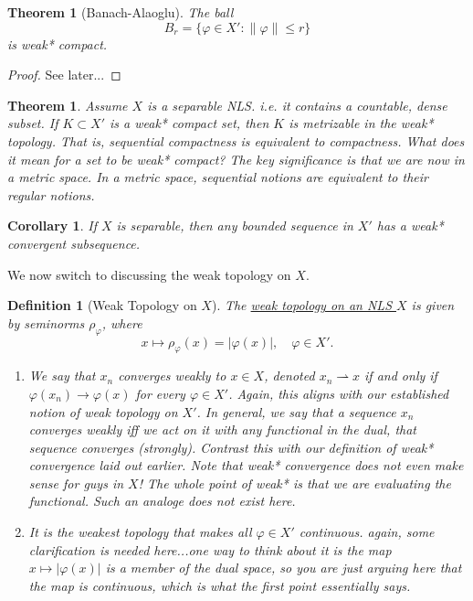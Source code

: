 \documentclass[letterpaper,twoside,11pt]{article}
\theoremstyle{mystyle}
\newtheorem{theorem}{Theorem}[section]
\newtheorem*{thm}{Theorem}		%
\newtheorem{definition}{Definition}[section]
\newtheorem{corollary}{Corollary}[theorem]
\newcommand{\cg}{\color{gray}}
\newcommand{\cbk}{\color{black}}
\newcommand{\cred}{\color{red}}
\begin{document}
\begin{tcolorbox}[colback=red!5!white,colframe=red!75!black]
  \begin{thm}[Banach-Alaoglu]
    The ball \[B_r = \{\varphi \in X' : \|\varphi\|\leq r\}\] is weak* compact. 
  \end{thm}
\end{tcolorbox}
\begin{proof}
  \cred See later...\cbk
\end{proof}
\begin{tcolorbox}[colback=red!5!white,colframe=red!75!black]
\begin{theorem}
  Assume $X$ is a separable NLS. \cg i.e. it contains a countable, dense subset. \cbk If $K\subset X'$ is a weak* compact set, then $K$ is metrizable in the weak* topology. That is, sequential compactness is equivalent to compactness. \cg What does it mean for a set to be weak* compact? The key significance is that we are now in a metric space. In a metric space, sequential notions are equivalent to their regular notions. \cbk
\end{theorem}
\end{tcolorbox}
\begin{tcolorbox}[colback=gray!5!white,colframe=red!75!black]
\begin{corollary}
  If $X$ is separable, then any bounded sequence in $X'$ has a weak* convergent subsequence. 
\end{corollary}
\end{tcolorbox}

We now switch to discussing the weak topology on $X$. 

\begin{definition}[Weak Topology on $X$]
  The \underline{weak topology on an NLS $X$} is given by seminorms $\rho_\varphi$, where 
  \[x\longmapsto \rho_\varphi(x)=|\varphi(x)|,\quad \varphi \in X'.\] 
  \begin{enumerate}
    \item We say that $x_n$ converges weakly to $x\in X$, denoted $x_n \rightharpoonup x$ if and only if $\varphi(x_n)\to \varphi(x)$ for every $\varphi \in X'$. \cg Again, this aligns with our established notion of weak topology on $X'$. In general, we say that a sequence $x_n$ converges weakly iff we act on it with any functional in the dual, that sequence converges (strongly). Contrast this with our definition of weak* convergence laid out earlier. Note that weak* convergence does not even make sense for guys in $X$! The whole point of weak* is that we are evaluating the functional. Such an analoge does not exist here. \cbk
    \item It is the weakest topology that makes all $\varphi \in X'$ continuous. \cred again, some clarification is needed here...\cg one way to think about it is the map $x\mapsto |\varphi(x)|$ is a member of the dual space, so you are just arguing here that the map is continuous, which is what the first point essentially says. \cbk 
  \end{enumerate}
\end{definition}
\end{document}
